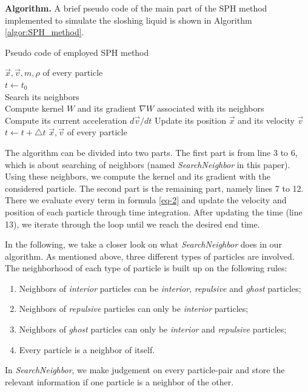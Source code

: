 \documentclass[letterpaper]{article}
\newcommand{\mypar}[1]{{\bf #1.}}
\begin{document}
\mypar{Algorithm}
A brief pseudo code of the main part of the SPH method implemented to simulate the sloshing liquid is shown in Algorithm \ref{algor:SPH_method}.
\begin{algorithm} 
\begin{algorithmic}[1]
\caption{Pseudo code of employed SPH method}
\label{algor:SPH_method}
\REQUIRE $\Vec{x},\Vec{v},m,\rho$ of every particle\\
\STATE $t \leftarrow t_0$\\
        \STATE Search its neighbors \\
        \STATE Compute kernel $W$ and its gradient $\nabla W$ associated with its neighbors\\
    \ENDFOR
        \STATE Compute its current acceleration $d\Vec{v}/dt$
    \ENDFOR
        \STATE Update its position $\Vec{x}$ and its velocity $\Vec{v}$
    \ENDFOR
    \STATE $t \leftarrow t + \triangle t$
\ENDWHILE
\ENSURE $\Vec{x},\Vec{v}$ of every particle
\end{algorithmic}  
\end{algorithm}

The algorithm can be divided into two parts. The first part is from line 3 to 6, which is about searching of neighbors (named  \emph{SearchNeighbor} in this paper). Using these neighbors, we compute the kernel and its gradient with the considered particle. The second part is the remaining part, namely lines 7 to 12. There we evaluate every term in formula \ref{eq-2} and update the velocity and position of each particle through time integration. After updating the time (line 13), we iterate through the loop until we reach the desired end time.

In the following, we take a closer look on what \emph{SearchNeighbor} does in our algorithm. As mentioned above, three different types of particles are involved. The neighborhood of each type of particle is built up on the following rules: 
\begin{enumerate}[noitemsep]
    \item Neighbors of \emph{interior} particles can be \emph{interior}, \emph{repulsive} and \emph{ghost} particles;
    \item Neighbors of \emph{repulsive} particles can only be \emph{interior} particles; 
    \item Neighbors of \emph{ghost} particles can only be \emph{interior} and \emph{repulsive} particles; 
    \item Every particle is a neighbor of itself. 
\end{enumerate}
In \emph{SearchNeighbor}, we make judgement on every particle-pair and store the relevant information if one particle is a neighbor of the other. 
\end{document}
